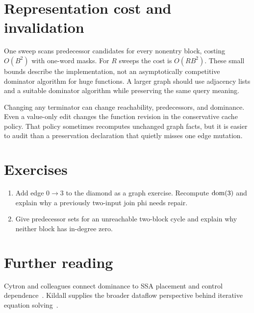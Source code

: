 \section{Representation cost and invalidation}
\label{sec:pebble-dom-cost}
One sweep scans predecessor candidates for every nonentry block, costing $O(B^2)$ with one-word masks.
For $R$ sweeps the cost is $O(RB^2)$.
These small bounds describe the implementation, not an asymptotically competitive dominator algorithm for huge functions.
A larger graph should use adjacency lists and a suitable dominator algorithm while preserving the same query meaning.

Changing any terminator can change reachability, predecessors, and dominance.
Even a value-only edit changes the function revision in the conservative cache policy.
That policy sometimes recomputes unchanged graph facts, but it is easier to audit than a preservation declaration that quietly misses one edge mutation.

\section{Exercises}
\label{sec:pebble-nine-exercises}
\begin{enumerate}
\item \label{ex:pebble-shortcut} Add edge $0\to3$ to the diamond as a graph exercise. Recompute $\operatorname{dom}(3)$ and explain why a previously two-input join phi needs repair.
\item \label{ex:pebble-unreachable-cycle} Give predecessor sets for an unreachable two-block cycle and explain why neither block has in-degree zero.
\end{enumerate}

\section{Further reading}
\label{sec:pebble-nine-reading}
Cytron and colleagues connect dominance to SSA placement and control dependence~\cite{cytron-1991-ssa}.
Kildall supplies the broader dataflow perspective behind iterative equation solving~\cite{kildall-1973-dataflow}.
